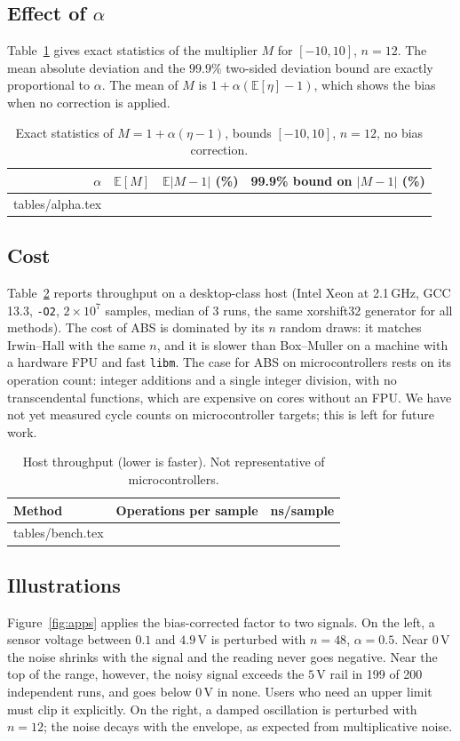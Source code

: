 \documentclass[10pt,a4paper]{article}
\theoremstyle{definition}
\theoremstyle{remark}
\newcommand{\E}{\mathbb{E}}
\begin{document}
\subsection{Effect of $\alpha$}
Table~\ref{tab:alpha} gives exact statistics of the multiplier $M$ for $[-10,10]$, $n=12$.
The mean absolute deviation and the $99.9\%$ two-sided deviation bound are exactly
proportional to $\alpha$. The mean of $M$ is $1+\alpha(\E[\eta]-1)$, which shows the bias
when no correction is applied.

\begin{table}[h]
\centering\small
\caption{Exact statistics of $M=1+\alpha(\eta-1)$, bounds $[-10,10]$, $n=12$, no bias correction.}
\label{tab:alpha}
\begin{tabular}{rrrr}
\toprule
$\alpha$ & $\E[M]$ & $\E|M-1|$ (\%) & 99.9\% bound on $|M-1|$ (\%)\\
\midrule
{} tables/alpha.tex 
\bottomrule
\end{tabular}
\end{table}

\subsection{Cost}
Table~\ref{tab:bench} reports throughput on a desktop-class host (Intel Xeon at 2.1\,GHz,
GCC 13.3, \texttt{-O2}, $2\times10^7$ samples, median of 3 runs, the same xorshift32
generator for all methods). The cost of ABS is dominated by its $n$ random draws: it matches
Irwin--Hall with the same $n$, and it is slower than Box--Muller on a machine with a hardware
FPU and fast \texttt{libm}. The case for ABS on microcontrollers rests on its operation
count: integer additions and a single integer division, with no transcendental functions,
which are expensive on cores without an FPU. We have not yet measured cycle counts on
microcontroller targets; this is left for future work.

\begin{table}[h]
\centering\small
\caption{Host throughput (lower is faster). Not representative of microcontrollers.}
\label{tab:bench}
\begin{tabular}{llr}
\toprule
Method & Operations per sample & ns/sample\\
\midrule
{} tables/bench.tex 
\bottomrule
\end{tabular}
\end{table}

\subsection{Illustrations}
Figure~\ref{fig:apps} applies the bias-corrected factor to two signals. On the left, a
sensor voltage between $0.1$ and $4.9$\,V is perturbed with $n=48$, $\alpha=0.5$. Near
$0$\,V the noise shrinks with the signal and the reading never goes negative. Near the top
of the range, however, the noisy signal exceeds the $5$\,V rail in 199 of 200
independent runs, and goes below $0$\,V in none. Users who need an upper limit must clip it explicitly. On the
right, a damped oscillation is perturbed with $n=12$; the noise decays with the envelope, as
expected from multiplicative noise.
\end{document}
